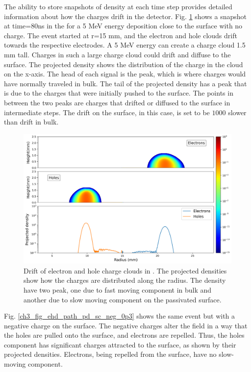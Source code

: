 The ability to store snapshots of density at each time step provides detailed information about how the charges drift in the detector. Fig. \ref{ch3_fig_ehd_path_pd_sc_0} shows a snapshot at time=$80$ns in the {\ehd} for a 5 MeV energy deposition close to the surface with no charge. The event started at r=15 mm, and the electron and hole clouds drift towards the respective electrodes.  A 5 MeV energy can create a charge cloud 1.5 mm tall. Charges in such a large charge cloud could drift and diffuse to the surface. The projected density shows the distribution of the charge in the cloud on the x-axis. The head of each signal is the peak, which is where charges would have normally traveled in bulk. The tail of the projected density has a peak that is due to the charges that were initially pushed to the surface. The points in between the two peaks are charges that drifted or diffused to the surface in intermediate steps. The drift on the surface, in this case, is set to be $1000$ slower than drift in bulk. 

\begin{figure}%
    \includegraphics[trim={0cm 0 0cm 0},clip,width=0.99\linewidth]{ch3/figs/drift_path_sc=0.0.png}
    \caption{Drift of electron and hole charge clouds in {\ehd}. The projected densities show how the charges are distributed along the radius. The density have two peak, one due to fast moving component in bulk and another due to slow moving component on the passivated surface.}
    \label{ch3_fig_ehd_path_pd_sc_0}
\end{figure}

Fig. \ref{ch3_fig_ehd_path_pd_sc_neg_0p3} shows the same event but with a negative charge on the surface. The negative charges alter the field in a way that the holes are pulled onto the surface, and electrons are repelled. Thus, the holes component has significant charges attracted to the surface, as shown by their projected densities. Electrons, being repelled from the surface, have no slow-moving component.


